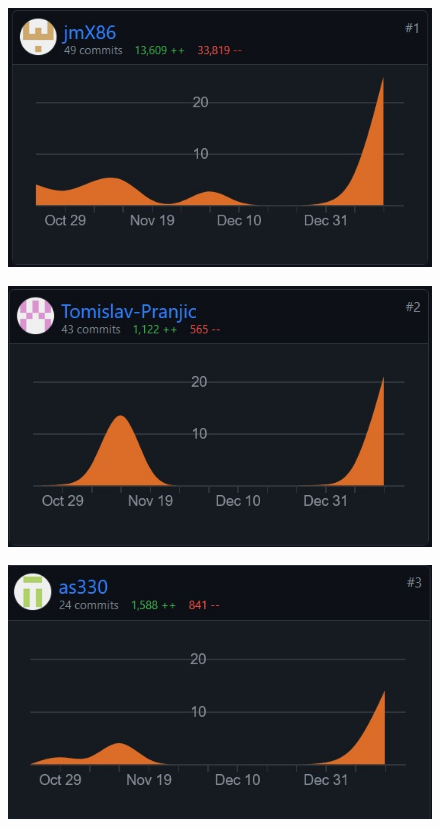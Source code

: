 		\begin{figure}[H]
			\includegraphics[width=\textwidth]{slike/josip.JPG}
			\label{josipDiagram}
		\end{figure}
	
		\begin{figure}[H]
			\includegraphics[width=\textwidth]{slike/tomislav.JPG}
			\label{tomiDiagram}
		\end{figure}
		
		\begin{figure}[H]
			\includegraphics[width=\textwidth]{slike/ante.JPG}
			\label{anteDiagram}
		\end{figure}
		
